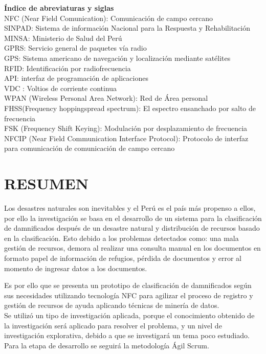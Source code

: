 \documentclass[11pt,openany]{book}
\newcounter{ns}
\begin{document}
	\tableofcontents
	\newpage
	\textbf{Índice de abreviaturas y siglas} \\[0.25cm]
	NFC (Near Field Comunication): Comunicación de campo cercano\\
	SINPAD: Sistema de información Nacional para la Respuesta y Rehabilitación\\
	MINSA: Ministerio de Salud del Perú\\
	GPRS: Servicio general de paquetes vía radio\\
	GPS: Sistema americano de navegación y localización mediante satélites\\
	RFID: Identificación por radiofrecuencia\\
	API: interfaz de programación  de aplicaciones\\
	VDC : Voltios de corriente continua\\
	WPAN (Wireless Personal Area Network): Red de Área personal\\
	FHSS(Frequency hoppingspread spectrum): El espectro ensanchado por salto de frecuencia\\
	FSK (Frequency Shift Keying): Modulación por desplazamiento de frecuencia\\
	NFCIP (Near Field Communication Interface Protocol): Protocolo de interfaz para comunicación de comunicación de campo cercano\\


	\newpage
	\listoftables
	\newpage
	\listoffigures


	\mainmatter
	\pagestyle{fancy}
	\lhead{\chaptername \ \thechapter} \chead{} \rhead{} 
	\lfoot{} \cfoot{\thepage} \rfoot{}
	\chapter*{RESUMEN}

	Los desastres naturales son inevitables y el Perú es el país más propenso a ellos, por ello la investigación se basa en el desarrollo de un sistema para la clasificación de damnificados después de un desastre natural y distribución de recursos basado en la clasificación. Esto debido a los problemas detectados como: una mala gestión de recursos, demora al realizar una consulta manual en los documentos en formato papel de información de refugios, pérdida de documentos  y error al momento de ingresar datos a los documentos.

	Es por ello que se presenta un prototipo de clasificación de damnificados según sus necesidades utilizando tecnología NFC para agilizar el proceso de registro y gestión de recursos de ayuda aplicando técnicas de minería de datos.\\
	Se utilizó un tipo de investigación aplicada, porque el conocimiento obtenido de la investigación será aplicado para resolver el problema, y un nivel de investigación explorativa, debido a que se investigará un tema poco estudiado. Para la etapa de desarrollo se seguirá la metodología Ágil Scrum.
\end{document}
